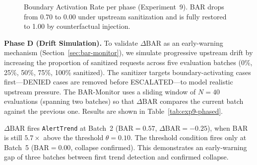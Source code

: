 \documentclass[11pt]{article}
\theoremstyle{definition}
\begin{document}
\begin{figure}[h!]
\centering
{}
\caption{Boundary Activation Rate per phase (Experiment~9).
  BAR drops from 0.70 to 0.00 under upstream sanitization and is fully
  restored to 1.00 by counterfactual injection.}
\label{fig:exp9-bar}
\end{figure}

\textbf{Phase D (Drift Simulation).}
To validate $\Delta\mathrm{BAR}$ as an early-warning mechanism
(Section~\ref{sec:bar-monitor}), we simulate progressive upstream drift by
increasing the proportion of sanitized requests across five evaluation batches
(0\%, 25\%, 50\%, 75\%, 100\% sanitized).
The sanitizer targets boundary-activating cases first---DENIED cases are
removed before ESCALATED---to model realistic upstream pressure.
The BAR-Monitor uses a sliding window of $N=40$ evaluations (spanning two
batches) so that $\Delta\mathrm{BAR}$ compares the current batch against
the previous one.
Results are shown in Table~\ref{tab:exp9-phased}.

$\Delta\mathrm{BAR}$ fires \texttt{AlertTrend} at Batch~2
($\mathrm{BAR}=0.57$, $\Delta\mathrm{BAR}=-0.25$),
when $\mathrm{BAR}$ is still $5.7\times$ above the threshold $\theta=0.10$.
The threshold condition fires only at Batch~5 ($\mathrm{BAR}=0.00$,
collapse confirmed).
This demonstrates an early-warning gap of three batches between first
trend detection and confirmed collapse.
\end{document}
